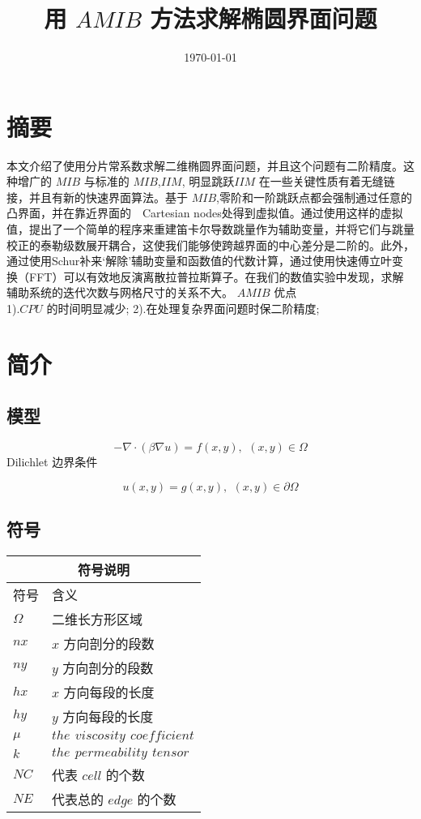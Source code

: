 \documentclass{article}
\begin{document}
\title{用 $AMIB$ 方法求解椭圆界面问题}
\date{\today}
\maketitle
\tableofcontents
\section{摘要}
本文介绍了使用分片常系数求解二维椭圆界面问题，并且这个问题有二阶精度。这种增广的 $MIB$ 与标准的 $MIB$,$IIM$, 明显跳跃$IIM$ 在一些关键性质有着无缝链接，并且有新的快速界面算法。基于 $MIB$,零阶和一阶跳跃点都会强制通过任意的凸界面，并在靠近界面的　Cartesian nodes处得到虚拟值。通过使用这样的虚拟值，提出了一个简单的程序来重建笛卡尔导数跳量作为辅助变量，并将它们与跳量校正的泰勒级数展开耦合，这使我们能够使跨越界面的中心差分是二阶的。此外，通过使用Schur补来‘解除’辅助变量和函数值的代数计算，通过使用快速傅立叶变换（FFT）可以有效地反演离散拉普拉斯算子。在我们的数值实验中发现，求解辅助系统的迭代次数与网格尺寸的关系不大。
$AMIB$ 优点\\
1).$CPU$ 的时间明显减少;
2).在处理复杂界面问题时保二阶精度; 

\section{简介}
\subsection{模型}

\begin{equation}
-\nabla \cdot (\beta\nabla u) = f(x,y),\,\ (x,y)\in \Omega
\end{equation}
Dilichlet 边界条件

\begin{equation}
u(x,y) = g(x,y),\,\ (x,y)\in \partial \Omega
\end{equation}
\subsection{符号}
\begin{tabular}{ |l|l| }   
\hline   
\multicolumn{2}{|c|}{符号说明} \\   
\hline
符号 & 含义\\
\hline
$\Omega$ & 二维长方形区域 \\
\hline
$nx$ & $x$ 方向剖分的段数 \\
\hline
$ny$ & $y$ 方向剖分的段数 \\
\hline
$hx$ &  $x$ 方向每段的长度\\
\hline
$hy$ &  $y$ 方向每段的长度 \\
\hline
$\mu$ & $the \,\ viscosity \,\ coefficient$ \\
\hline
$k$ & $the \,\ permeability \,\ tensor$ \\
\hline 
$NC$ & 代表 $cell$ 的个数 \\
\hline
$NE$ & 代表总的 $edge$ 的个数 \\
\hline
\end{tabular}
\end{document}
